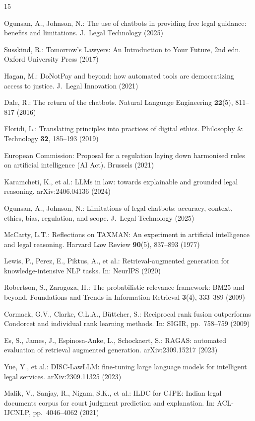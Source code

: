 \documentclass[runningheads]{llncs}
\begin{document}
\begin{thebibliography}{15}

Ogunsan, A., Johnson, N.: The use of chatbots in providing free legal guidance:
benefits and limitations. J.\ Legal Technology (2025)

Susskind, R.: Tomorrow's Lawyers: An Introduction to Your Future, 2nd edn.
Oxford University Press (2017)

Hagan, M.: DoNotPay and beyond: how automated tools are democratizing access to
justice. J.\ Legal Innovation (2021)

Dale, R.: The return of the chatbots. Natural Language Engineering
\textbf{22}(5), 811--817 (2016)

Floridi, L.: Translating principles into practices of digital ethics.
Philosophy \& Technology \textbf{32}, 185--193 (2019)

European Commission: Proposal for a regulation laying down harmonised rules on
artificial intelligence (AI Act). Brussels (2021)

Karamcheti, K., et al.: LLMs in law: towards explainable and grounded legal
reasoning. arXiv:2406.04136 (2024)

Ogunsan, A., Johnson, N.: Limitations of legal chatbots: accuracy, context,
ethics, bias, regulation, and scope. J.\ Legal Technology (2025)

McCarty, L.T.: Reflections on TAXMAN: An experiment in artificial intelligence and
legal reasoning. Harvard Law Review \textbf{90}(5), 837--893 (1977)

Lewis, P., Perez, E., Piktus, A., et al.: Retrieval-augmented generation for
knowledge-intensive NLP tasks. In: NeurIPS (2020)

Robertson, S., Zaragoza, H.: The probabilistic relevance framework: BM25 and
beyond. Foundations and Trends in Information Retrieval \textbf{3}(4),
333--389 (2009)

Cormack, G.V., Clarke, C.L.A., B\"uttcher, S.: Reciprocal rank fusion
outperforms Condorcet and individual rank learning methods. In: SIGIR,
pp.~758--759 (2009)

Es, S., James, J., Espinosa-Anke, L., Schockaert, S.: RAGAS: automated
evaluation of retrieval augmented generation. arXiv:2309.15217 (2023)

Yue, Y., et al.: DISC-LawLLM: fine-tuning large language models for
intelligent legal services. arXiv:2309.11325 (2023)

Malik, V., Sanjay, R., Nigam, S.K., et al.: ILDC for CJPE: Indian legal
documents corpus for court judgment prediction and explanation. In: ACL-IJCNLP,
pp.~4046--4062 (2021)

\end{thebibliography}
\end{document}
